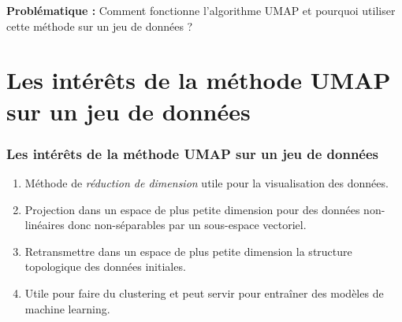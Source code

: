 \documentclass{beamer}
\theoremstyle{definition}
\begin{document}
\begin{frame}
\begin{minipage}[c]{1\linewidth}
\begin{minipage}[t]{0.43\linewidth}
\begin{figure}
	\end{figure}\end{minipage}
	\end{minipage}
\textcolor{modernvert}{\textbf{Problématique :}} Comment fonctionne l'algorithme UMAP et pourquoi utiliser cette méthode sur un jeu de données ?
\end{frame}

\begin{frame}
	\tableofcontents
\end{frame}

\section{Les intérêts de la méthode UMAP sur un jeu de données}
\begin{frame}
	\frametitle{Les intérêts de la méthode UMAP sur un jeu de données}
	\begin{enumerate}[$\star$]
		\item Méthode de \emph{réduction de dimension} utile pour la visualisation des données.
		\item Projection dans un espace de plus petite dimension pour des données non-linéaires donc non-séparables par un sous-espace vectoriel. 
		\item Retransmettre dans un espace de plus petite dimension la structure topologique des données initiales. 
		\item Utile pour faire du clustering et peut servir pour entraîner des modèles de machine learning. 
	\end{enumerate}
	
\end{frame}
\end{document}
